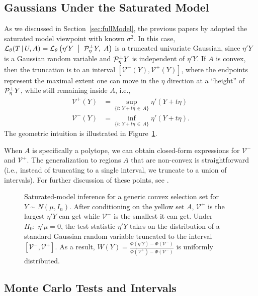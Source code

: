 \documentclass{article}
\theoremstyle{definition}
\newcommand{\cV}{\mathcal{V}}
\newcommand{\Gv}{\;\;\big|\;\;}
\newcommand{\proj}{\cP}
\newcommand{\cL}{\mathcal{L}}
\begin{document}
\subsection{Gaussians Under the Saturated Model}\label{sec:classifying}

As we discussed in Section~\ref{sec:fullModel}, the previous papers by \citet{lee2016exact,loftus2014significance,lee2014marginal} adopted the saturated model viewpoint with known $\sigma^2$. In this case, $\cL_\theta(T\gv U, A) = \cL_\theta\left( \eta'Y \Gv \proj_\eta^\perp Y, \; A\right)$ is a truncated univariate Gaussian, since $\eta' Y$ is a Gaussian random variable and $\proj_\eta^\perp Y$ is independent of $\eta' Y$. If $A$ is convex, then the truncation is to an interval $[\cV^-(Y), \cV^+(Y)]$, where the endpoints represent the maximal extent one can move in the $\eta$ direction at a ``height'' of $\proj_\eta^\perp Y$, while still remaining inside $A$, i.e.,
\begin{align}
  \cV^{+}(Y) &= \sup_{\{t:\,Y + t\eta \,\in\, A\}} \eta'(Y+t\eta)\\[5pt]
  \cV^{-}(Y) &= \inf_{\{t:\,Y + t\eta \,\in\, A\}} \eta'(Y+t\eta).
\end{align}
The geometric intuition is illustrated in Figure~\ref{fig:blob}.

When $A$ is specifically a polytope, we can obtain closed-form expressions for $\cV^-$ and $\cV^+$. The generalization to regions $A$ that are non-convex is straightforward (i.e., instead of truncating to a single interval, we truncate to a union of intervals). For further discussion of these points, see \citet{lee2016exact}.


 \begin{figure}
   \centering
 \def\svgwidth{0.4\textwidth}

   \caption{Saturated-model inference for a generic convex selection set for ${Y\sim N(\mu, I_n)}$. After conditioning on the yellow set $A$, $\cV^+$ is the largest $\eta'Y$ can get while $\cV^-$ is the smallest it can get. Under $H_0:\;\eta'\mu = 0$, the test statistic $\eta'Y$ takes on the distribution of a standard Gaussian random variable truncated to the interval $[\cV^-, \cV^+]$. As a result, $W(Y) = \frac{ \Phi(\eta'Y) - \Phi(\cV^-)}{ \Phi(\cV^+) - \Phi(\cV^-)}$ is uniformly distributed.}
   \label{fig:blob}
 \end{figure}


\subsection{Monte Carlo Tests and Intervals}\label{sec:monte}
\end{document}
